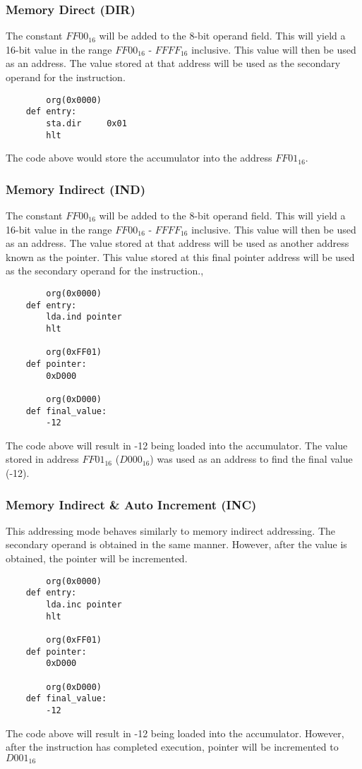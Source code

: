 \documentclass[11pt]{article}
\begin{document}
    \subsubsection{Memory Direct (DIR)}
    \par The constant $FF00_{16}$ will be added to the 8-bit operand field.
    This will yield a 16-bit value in the range $FF00_{16}$ - $FFFF_{16}$ inclusive.
    This value will then be used as an address.
    The value stored at that address will be used as the secondary operand for the instruction.
    \begin{verbatim}
        org(0x0000)
    def entry:
        sta.dir     0x01
        hlt
    \end{verbatim}
    The code above would store the accumulator into the address $FF01_{16}$.

    \subsubsection{Memory Indirect (IND)}
    The constant $FF00_{16}$ will be added to the 8-bit operand field.
    This will yield a 16-bit value in the range $FF00_{16}$ - $FFFF_{16}$ inclusive.
    This value will then be used as an address.
    The value stored at that address will be used as another address known as the pointer.
    This value stored at this final pointer address will be used as the secondary operand for the instruction.,
    \begin{verbatim}
        org(0x0000)
    def entry:
        lda.ind pointer
        hlt

        org(0xFF01)
    def pointer:
        0xD000

        org(0xD000)
    def final_value:
        -12
    \end{verbatim}
    The code above will result in -12 being loaded into the accumulator.
    The value stored in address $FF01_{16}$ ($D000_{16}$) was used as an address to find the final value (-12).

    \subsubsection{Memory Indirect \& Auto Increment (INC)}
    This addressing mode behaves similarly to memory indirect addressing.
    The secondary operand is obtained in the same manner.
    However, after the value is obtained, the pointer will be incremented.
    \begin{verbatim}
        org(0x0000)
    def entry:
        lda.inc pointer
        hlt

        org(0xFF01)
    def pointer:
        0xD000

        org(0xD000)
    def final_value:
        -12
    \end{verbatim}
    The code above will result in -12 being loaded into the accumulator.
    However, after the instruction has completed execution, pointer will be incremented to $D001_{16}$
\end{document}
